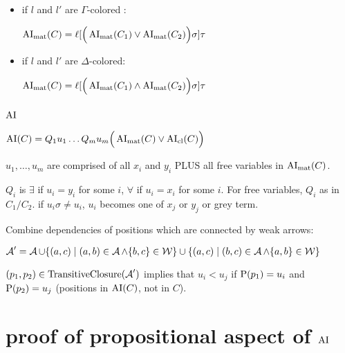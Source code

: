 \documentclass[,%
	paper=a4,%
	DIV12, %
	twoside=false,%
	liststotoc,
	bibtotoc,
	draft=false,%
	numbers=noendperiod
]{scrartcl}
\begin{document}
\begin{enumerate}
\begin{itemize}


			\item if $l$ and $l'$ are $\Gamma$-colored :

				$\operatorname{AI}_\mathrm{mat}(C) = \ell[\Big(\operatorname{AI}_\mathrm{mat}(C_1) \lor \operatorname{AI}_\mathrm{mat}(C_2)\Big)\sigma] \tau$
			\item if $l$ and $l'$ are $\Delta$-colored:

				$\operatorname{AI}_\mathrm{mat}(C) = \ell[\Big(\operatorname{AI}_\mathrm{mat}(C_1) \land \operatorname{AI}_\mathrm{mat}(C_2)\Big)\sigma] \tau$


		\end{itemize}

\end{enumerate}

\subsubsection{$\operatorname{AI}$}


$\operatorname{AI}(C) = Q_1 u_1 \ldots Q_m u_m \Big( \operatorname{AI}_\mathrm{mat}(C) \lor \operatorname{AI}_\mathrm{cl}(C) \Big)$

$u_1, \ldots, u_m$ are comprised of all $x_i$ and $y_i$ PLUS all free variables in $\operatorname{AI}_\mathrm{mat}(C)$.

$Q_i$ is $\exists$ if $u_i = y_i$ for some $i$, $\forall$ if $u_i = x_i$ for some $i$.
For free variables, $Q_i$ as in $C_1/C_2$. if $u_i\sigma \neq u_i$, $u_i$ becomes one of $x_j$ or $y_j$ or grey term.

Combine dependencies of positions which are connected by weak arrows:

$\operatorname{\mathcal{A}}' =  \operatorname{\mathcal{A}} \cup \{(a, c) \mid (a, b) \in \operatorname{\mathcal{A}} \land \{b, c\} \in \operatorname{\mathcal{W}}\} \cup \{(a, c) \mid (b, c) \in \operatorname{\mathcal{A}} \land \{a, b\} \in \operatorname{\mathcal{W}}\} $

$(p_1, p_2) \in \operatorname{TransitiveClosure}(\operatorname{\mathcal{A}}')$ implies
that $u_i < u_j$ if $\operatorname{{\operatorname P}}(p_1) = u_i$ and $\operatorname{{\operatorname P}}(p_2) = u_j$ (positions in $\operatorname{AI}(C)$, not in $C$).


\clearpage

\section{proof of propositional aspect of $\operatorname{AI}$}
\end{document}
